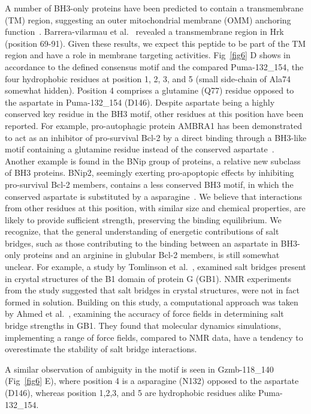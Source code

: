 \documentclass[10pt,letterpaper]{article}
\begin{document}
A number of BH3-only proteins have been predicted to contain a transmembrane (TM) region, suggesting an outer mitochondrial membrane (OMM) anchoring function~\cite{Sattler2010}. Barrera-vilarmau et al.~\cite{Barrera-Vilarmau2011} revealed a transmembrane region in Hrk (position 69-91). Given these results, we expect this peptide to be part of the TM region and have a role in membrane targeting activities. 
Fig~\ref{fig6} D shows in accordance to the defined consensus motif and the compared Puma-132\_154, the four hydrophobic residues at position 1, 2, 3, and 5 (small side-chain of Ala74 somewhat hidden). Position 4 comprises a glutamine (Q77) residue opposed to the aspartate in Puma-132\_154 (D146). Despite aspartate being a highly conserved key residue in the BH3 motif, other residues at this position have been reported. For example, pro-autophagic protein AMBRA1 has been demonstrated to act as an inhibitor of pro-survival Bcl-2 by a direct binding through a BH3-like motif containing a glutamine residue instead of the conserved aspartate~\cite{Strappazzon2016}. Another example is found in the BNip group of proteins, a relative new subclass of BH3 proteins. BNip2, seemingly exerting pro-apoptopic effects by inhibiting pro-survival Bcl-2 members, contains a less conserved BH3 motif, in which the conserved aspartate is substituted by a asparagine~\cite{Zhang2003}.
We believe that interactions from other residues at this position, with similar size and chemical properties, are likely to provide sufficient strength, preserving the binding equilibrium. We recognize, that the general understanding of energetic contributions of salt bridges, such as those contributing to the binding between an aspartate in BH3-only proteins and an arginine in glubular Bcl-2 members, is still somewhat unclear. For example, a study by Tomlinson et al.~\cite{Tomlinson2009}, examined salt bridges present in crystal structures of the B1 domain of protein G (GB1). NMR experiments from the study suggested that salt bridges in crystal structures, were not in fact formed in solution. Building on this study, a computational approach was taken by Ahmed et al.~\cite{Ahmed2018}, examining the accuracy of force fields in determining salt bridge strengths in GB1. They found that molecular dynamics simulations, implementing a range of force fields, compared to NMR data, have a tendency to overestimate the stability of salt bridge interactions.

A similar observation of ambiguity in the motif is seen in Gzmb-118\_140 (Fig~\ref{fig6} E), where position 4 is a asparagine (N132) opposed to the aspartate (D146), whereas position 1,2,3, and 5 are hydrophobic residues alike Puma-132\_154.
\end{document}
